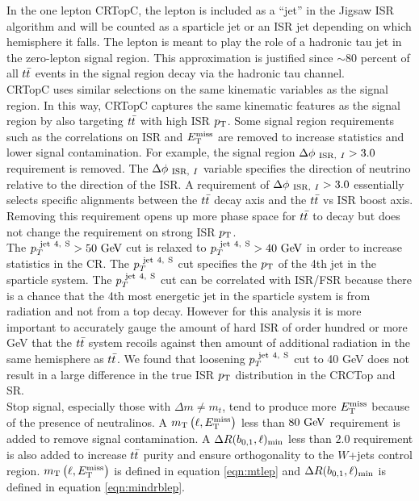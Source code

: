 \indent In the one lepton CRTopC, the lepton is included as a ``jet'' in the Jigsaw ISR algorithm and will be counted as a sparticle jet or an ISR jet depending on which hemisphere it falls.  The lepton is meant to play the role of a hadronic tau jet in the zero-lepton signal region.  This approximation is justified since $\sim80$ percent of all $t\bar{t}$ events in the signal region decay via the hadronic tau channel.  \\

\indent CRTopC uses similar selections on the same kinematic variables as the signal region.  In this way, CRTopC captures the same kinematic features as the signal region by also targeting $t\bar{t}$ with high ISR $p_{\mathrm{T}}$. Some signal region requirements such as the correlations on ISR and $E_{\mathrm{T}}^{\mathrm{miss}}$ are removed to increase statistics and lower signal contamination.  For example, the signal region $\Delta\phi_{~\mathrm{ISR},~I} > 3.0$ requirement is removed.  The $\Delta\phi_{~\mathrm{ISR},~I}$ variable specifies the direction of neutrino relative to the direction of the ISR.  A requirement of $\Delta\phi_{~\mathrm{ISR},~I}>3.0$ essentially selects specific alignments between the $t\bar{t}$ decay axis and the $t\bar{t}$ vs ISR boost axis.  Removing this requirement opens up more phase space for $t\bar{t}$ to decay but does not change the requirement on strong ISR $p_{\mathrm{T}}$. \\

\indent The $\pTjV>50\gev$ cut is relaxed to $\pTjV>40\gev$ in order to increase statistics in the CR.  The $p_{T}^{~\mathrm{jet~4,~S}}$ cut specifies the $p_{\mathrm{T}}$ of the 4th jet in the sparticle system.  The $p_{T}^{~\mathrm{jet~4,~S}}$ cut can be correlated with ISR/FSR because there is a chance that the 4th most energetic jet in the sparticle system is from radiation and not from a top decay.  However for this analysis it is more important to accurately gauge the amount of hard ISR of order hundred or more GeV that the $t\bar{t}$ system recoils against then amount of additional radiation in the same hemisphere as $t\bar{t}$. We found that loosening $p_{T}^{~\mathrm{jet~4,~S}}$ cut to 40 GeV does not result in a large difference in the true ISR $p_{\mathrm{T}}$ distribution in the CRCTop and SR. \\

\indent  Stop signal, especially those with $\Delta m \neq m_{t}$, tend to produce more $E_{\mathrm{T}}^{\mathrm{miss}}$ because of the presence of neutralinos.  A $m_{\mathrm{T}}\left(\ell,E_{\mathrm{T}}^{\mathrm{miss}}\right)$ less than $80\gev$ requirement is added to remove signal contamination.   A $\Delta R(b_{0,1},\ell)_{\mathrm{min}}$ less than $2.0$ requirement is also added to increase $t\bar{t}$ purity and ensure orthogonality to the $W$+jets control region. $m_{\mathrm{T}}\left(\ell,E_{\mathrm{T}}^{\mathrm{miss}}\right)$ is defined in equation \ref{eqn:mtlep} and $\Delta R(b_{0,1},\ell)_{\mathrm{min}}$ is defined in equation \ref{eqn:mindrblep}. \\

